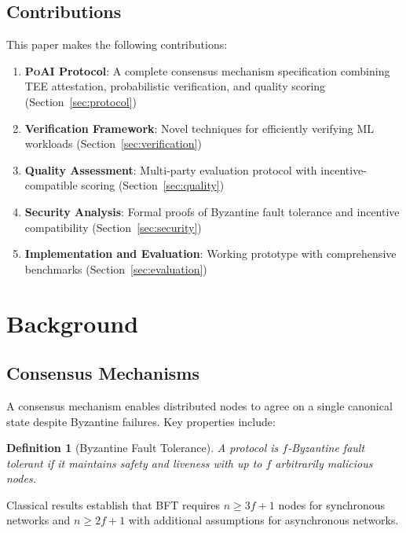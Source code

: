 \documentclass[11pt,letterpaper]{article}
\newtheorem{definition}{Definition}[section]
\newcommand{\PoAI}{\textsc{PoAI}}
\begin{document}
\subsection{Contributions}

This paper makes the following contributions:

\begin{enumerate}
    \item \textbf{\PoAI{} Protocol}: A complete consensus mechanism specification combining TEE attestation, probabilistic verification, and quality scoring (Section~\ref{sec:protocol})

    \item \textbf{Verification Framework}: Novel techniques for efficiently verifying ML workloads (Section~\ref{sec:verification})

    \item \textbf{Quality Assessment}: Multi-party evaluation protocol with incentive-compatible scoring (Section~\ref{sec:quality})

    \item \textbf{Security Analysis}: Formal proofs of Byzantine fault tolerance and incentive compatibility (Section~\ref{sec:security})

    \item \textbf{Implementation and Evaluation}: Working prototype with comprehensive benchmarks (Section~\ref{sec:evaluation})
\end{enumerate}

\section{Background}

\subsection{Consensus Mechanisms}

A consensus mechanism enables distributed nodes to agree on a single canonical state despite Byzantine failures. Key properties include:

\begin{definition}[Byzantine Fault Tolerance]
A protocol is $f$-Byzantine fault tolerant if it maintains safety and liveness with up to $f$ arbitrarily malicious nodes.
\end{definition}

Classical results establish that BFT requires $n \geq 3f + 1$ nodes for synchronous networks and $n \geq 2f + 1$ with additional assumptions for asynchronous networks.
\end{document}
